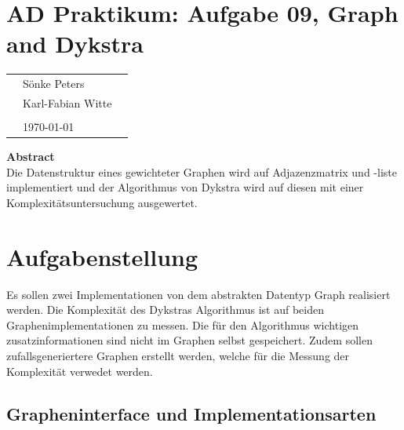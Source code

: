 \documentclass[
   draft=false
  ,paper=a4
  ,twoside=false
  ,fontsize=11pt
  ,headsepline
  ,DIV11
  ,parskip=full+
]{scrartcl} %
\begin{document}
\def\titel{AD Praktikum: Aufgabe 09, Graph and Dykstra}


\def\teilnehmer{ 
	& Sönke Peters & \\
    & Karl-Fabian Witte   & \\
}




\newlength{\txtw} %
\setlength{\txtw}{\textwidth} %
\addtolength{\txtw}{-10\tabcolsep} %

\def\me{\myName \newline \footnotesize{\url{\myEmail} } }

\section*{\titel}
\begin{tabular}{l p{0.4\txtw} p{0.4\txtw} }
	\teilnehmer
	& & \\
	& \today & \\
\end{tabular}


\centering
\textbf{Abstract} \\
Die Datenstruktur eines gewichteter Graphen wird auf Adjazenzmatrix und -liste implementiert und der Algorithmus von Dykstra wird auf diesen mit 
einer Komplexitätsuntersuchung ausgewertet. 
\normalsize \flushleft
\section{Aufgabenstellung}
Es sollen zwei Implementationen von dem abstrakten Datentyp Graph 
realisiert werden. Die Komplexität des Dykstras Algorithmus 
ist auf beiden Graphenimplementationen zu messen. Die für den 
Algorithmus wichtigen zusatzinformationen sind nicht im Graphen
selbst gespeichert. 
Zudem sollen zufallsgeneriertere Graphen erstellt werden, welche 
für die Messung der Komplexität verwedet werden.

\subsection{Grapheninterface und Implementationsarten}
\end{document}
